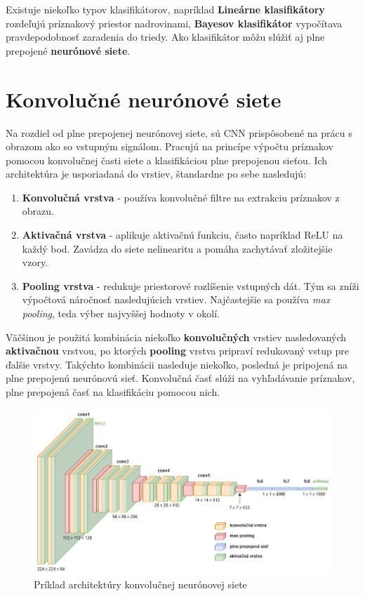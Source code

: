         Existuje niekoľko typov klasifikátorov, napríklad \textbf{Lineárne klasifikátory} rozdeľujú príznakový priestor nadrovinami, \textbf{Bayesov klasifikátor} vypočítava pravdepodobnosť zaradenia do triedy. Ako klasifikátor môžu slúžiť aj plne prepojené \textbf{neurónové siete}.

    \section{Konvolučné neurónové siete}

        Na rozdiel od plne prepojenej neurónovej siete, sú \ac{CNN} prispôsobené na prácu s obrazom ako so vstupným signálom. Pracujú na princípe výpočtu príznakov pomocou konvolučnej časti siete a klasifikáciou plne prepojenou sieťou. Ich architektúra je usporiadaná do vrstiev, štandardne po sebe nasledujú:

        \begin{enumerate}
            \item \textbf{Konvolučná vrstva} - používa konvolučné filtre na extrakciu príznakov z obrazu.
            \item \textbf{Aktivačná vrstva} - aplikuje aktivačnú funkciu, často napríklad \ac{ReLU} na každý bod. Zavádza do siete nelinearitu a pomáha zachytávať zložitejšie vzory.
            \item \textbf{Pooling vrstva} - redukuje priestorové rozlíšenie vstupných dát. Tým sa zníži výpočtová náročnosť nasledujúcich vrstiev. Najčastejšie sa používa \emph{max pooling}, teda výber najvyššej hodnoty v okolí.
        \end{enumerate}

        Väčšinou je použitá kombinácia niekoľko \textbf{konvolučných} vrstiev nasledovaných \textbf{aktivačnou} vrstvou, po ktorých \textbf{pooling} vrstva pripraví redukovaný vstup pre ďalšie vrstvy. Takýchto kombinácii nasleduje niekoľko, posledná je pripojená na plne prepojenú neurónovú sieť. Konvolučná časť slúži na vyhľadávanie príznakov, plne prepojená časť na klasifikáciu pomocou nich.

        \begin{figure}[h]
            \centering
            \includegraphics[width=.9\textwidth]{obrazky/cnn/cnn.png}
            \caption{Príklad architektúry konvolučnej neurónovej siete}
        \end{figure}

